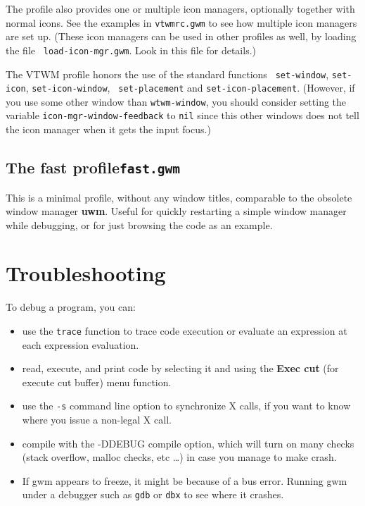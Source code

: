 The profile also provides one or multiple icon managers, optionally
together with normal icons. See the examples in {\tt vtwmrc.gwm} to
see how multiple icon managers are set up. (These icon managers can be
used in other profiles as well, by loading the file {\tt
load-icon-mgr.gwm}. Look in this file for details.)

The VTWM profile honors the use of the standard functions {\tt
set-window}, {\tt set-icon}, {\tt set-icon-window}, {\tt
set-placement} and {\tt set-icon-placement}. (However, if you use some
other window than {\tt wtwm-window}, you should consider setting the
variable {\tt icon-mgr-window-feedback} to {\tt nil} since this other
windows does not tell the icon manager when it gets the input
focus.) 


\subsection{The fast profile\hfill{\tt fast.gwm}}
\label{fast}

This is a minimal profile, without any window titles, comparable to the
obsolete window manager {\bf uwm}. Useful for quickly restarting a simple
window manager while debugging, or for just browsing the code as an example.

\section{Troubleshooting}

To debug a {\WOOL} program, you can:

\begin{itemize}

\item use the \verb"trace" function to trace code execution or evaluate an
expression at each expression evaluation.

\item read, execute, and print {\WOOL} code by selecting it and using
the {\bf Exec cut} (for execute cut buffer) menu function.

\item use the \verb"-s" command line option to synchronize X calls, if you want
to know where you issue a non-legal X call.

\item compile {\GWM} with the -DDEBUG compile option, which will turn on many
checks (stack overflow, malloc checks, etc \ldots ) in case you manage to make
{\GWM} crash.  

\item If gwm appears to freeze, it might be because of a bus
error. Running gwm under a debugger such as \verb|gdb| or \verb|dbx| to see
where it crashes.

\end{itemize}
